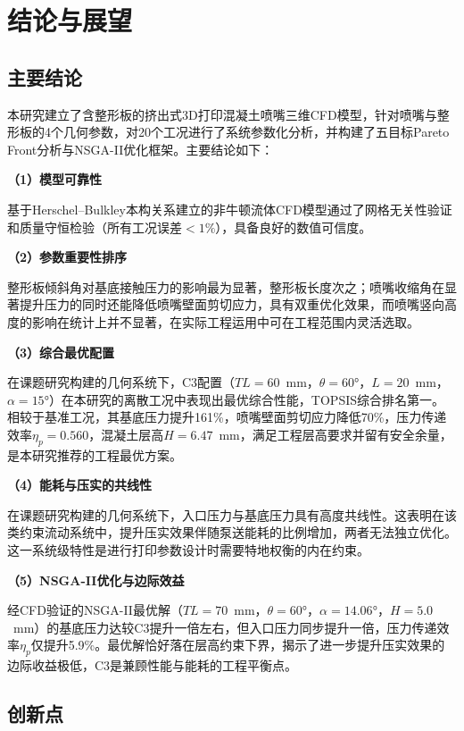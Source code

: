 \chapter{结论与展望}\label{chap:conclusion}

\section{主要结论}

本研究建立了含整形板的挤出式3D打印混凝土喷嘴三维CFD模型，针对喷嘴与整形板的4个几何参数，对20个工况进行了系统参数化分析，并构建了五目标Pareto Front分析与NSGA-II优化框架。主要结论如下：

\textbf{（1）模型可靠性}

基于Herschel--Bulkley本构关系建立的非牛顿流体CFD模型通过了网格无关性验证和质量守恒检验（所有工况误差$<1\%$），具备良好的数值可信度。

\textbf{（2）参数重要性排序}

整形板倾斜角对基底接触压力的影响最为显著，整形板长度次之；喷嘴收缩角在显著提升压力的同时还能降低喷嘴壁面剪切应力，具有双重优化效果，而喷嘴竖向高度的影响在统计上并不显著，在实际工程运用中可在工程范围内灵活选取。

\textbf{（3）综合最优配置}

在课题研究构建的几何系统下，C3配置（$TL=60$~mm，$\theta=60°$，$L=20$~mm，$\alpha=15°$）在本研究的离散工况中表现出最优综合性能，TOPSIS综合排名第一。相较于基准工况，其基底压力提升161\%，喷嘴壁面剪切应力降低70\%，压力传递效率$\eta_p=0.560$，混凝土层高$H=6.47$~mm，满足工程层高要求并留有安全余量，是本研究推荐的工程最优方案。

\textbf{（4）能耗与压实的共线性}

在课题研究构建的几何系统下，入口压力与基底压力具有高度共线性。这表明在该类约束流动系统中，提升压实效果伴随泵送能耗的比例增加，两者无法独立优化。这一系统级特性是进行打印参数设计时需要特地权衡的内在约束。

\textbf{（5）NSGA-II优化与边际效益}

经CFD验证的NSGA-II最优解（$TL=70$~mm，$\theta=60°$，$\alpha=14.06°$，$H=5.0$~mm）的基底压力达较C3提升一倍左右，但入口压力同步提升一倍，压力传递效率$\eta_p$仅提升5.9\%。最优解恰好落在层高约束下界，揭示了进一步提升压实效果的边际收益极低，C3是兼顾性能与能耗的工程平衡点。

\section{创新点}

